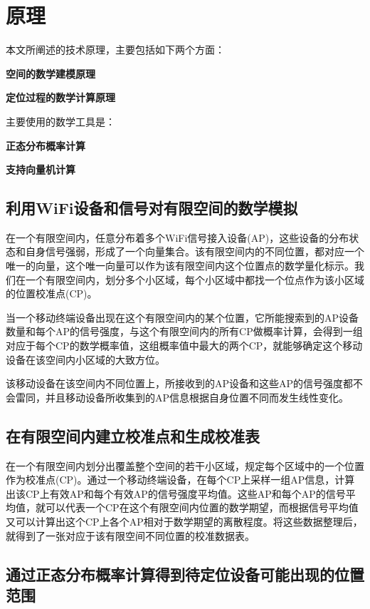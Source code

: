 \documentclass[UTF8, twocolumn ]{ctexart}
\begin{document}

\section{原理}
本文所阐述的技术原理，主要包括如下两个方面：
\begin{compactitem}
\item\textbf{空间的数学建模原理}
\item\textbf{定位过程的数学计算原理}
\end{compactitem}
\par
主要使用的数学工具是：
\begin{compactitem}
\item\textbf{正态分布概率计算}
\item\textbf{支持向量机计算}
\end{compactitem}

\subsection{利用WiFi设备和信号对有限空间的数学模拟}
在一个有限空间内，任意分布着多个WiFi信号接入设备(AP)，这些设备的分布状态和自身信号强弱，形成了一个向量集合。该有限空间内的不同位置，都对应一个唯一的向量，这个唯一向量可以作为该有限空间内这个位置点的数学量化标示。我们在一个有限空间内，划分多个小区域，每个小区域中都找一个位点作为该小区域的位置校准点(CP)。
\par
当一个移动终端设备出现在这个有限空间内的某个位置，它所能搜索到的AP设备数量和每个AP的信号强度，与这个有限空间内的所有CP做概率计算，会得到一组对应于每个CP的数学概率值，这组概率值中最大的两个CP，就能够确定这个移动设备在该空间内小区域的大致方位。
\par
该移动设备在该空间内不同位置上，所接收到的AP设备和这些AP的信号强度都不会雷同，并且移动设备所收集到的AP信息根据自身位置不同而发生线性变化。
\subsection{在有限空间内建立校准点和生成校准表}
在一个有限空间内划分出覆盖整个空间的若干小区域，规定每个区域中的一个位置作为校准点(CP)。通过一个移动终端设备，在每个CP上采样一组AP信息，计算出该CP上有效AP和每个有效AP的信号强度平均值。这些AP和每个AP的信号平均值，就可以代表一个CP在这个有限空间内位置的数学期望，而根据信号平均值又可以计算出这个CP上各个AP相对于数学期望的离散程度。将这些数据整理后，就得到了一张对应于该有限空间不同位置的校准数据表。

\subsection{通过正态分布概率计算得到待定位设备可能出现的位置范围}
\end{document}
